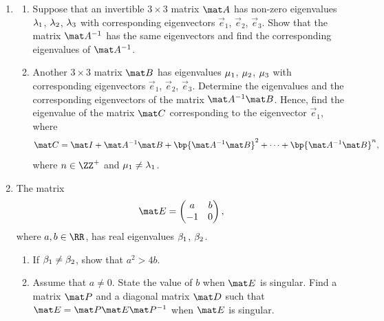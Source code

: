 \begin{problem}
    \begin{enumerate}
        \item \begin{enumerate}
            \item Suppose that an invertible $3 \times 3$ matrix $\mat A$ has non-zero eigenvalues $\lambda_1$, $\lambda_2$, $\lambda_3$ with corresponding eigenvectors $\vec e_1$, $\vec e_2$, $\vec e_3$. Show that the matrix $\mat A^{-1}$ has the same eigenvectors and find the corresponding eigenvalues of $\mat A^{-1}$.
            \item Another $3 \times 3$ matrix $\mat B$ has eigenvalues $\mu_1$, $\mu_2$, $\mu_3$ with corresponding eigenvectors $\vec e_1$, $\vec e_2$, $\vec e_3$. Determine the eigenvalues and the corresponding eigenvectors of the matrix $\mat A^{-1} \mat B$. Hence, find the eigenvalue of the matrix $\mat C$ corresponding to the eigenvector $\vec e_1$, where \[\mat C = \mat I + \mat A^{-1} \mat B + \bp{\mat A^{-1} \mat B}^2 + \dots + \bp{\mat A^{-1} \mat B}^n,\] where $n \in \ZZ^+$ and $\mu_1 \neq \lambda_1$.
        \end{enumerate}
        \item The matrix \[\mat E = \begin{pmatrix}a & b \\ -1 & 0\end{pmatrix},\] where $a, b \in \RR$, has real eigenvalues $\beta_1$, $\beta_2$.
        \begin{enumerate}
            \item If $\beta_1 \neq \beta_2$, show that $a^2 > 4b$.
            \item Assume that $a \neq 0$. State the value of $b$ when $\mat E$ is singular. Find a matrix $\mat P$ and a diagonal matrix $\mat D$ such that $\mat E = \mat P \mat E \mat P^{-1}$ when $\mat E$ is singular.
        \end{enumerate}
    \end{enumerate}
\end{problem}
